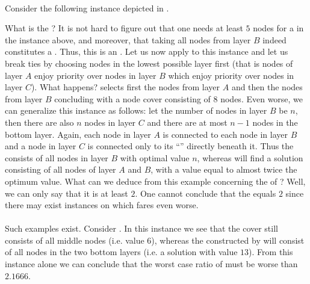 \paragraph{}
Consider the following instance depicted in .


What is the ? It is not hard to figure out that one needs at least $5$ nodes for a  in the instance above, and moreover, that taking all nodes from layer $B$ indeed constitutes a . Thus, this is an . Let us now apply  to this instance and let us break ties by choosing nodes in the lowest possible layer first (that is nodes of layer $A$ enjoy priority over nodes in layer $B$ which enjoy priority over nodes in layer $C$). What happens?  selects first the nodes from layer $A$ and then the nodes from layer $B$ concluding with a node cover consisting of $8$ nodes. Even worse, we can generalize this instance as follows: let the number of nodes in layer $B$ be $n$, then there are also $n$ nodes in layer $C$ and there are at most $n-1$ nodes in the bottom layer. Again, each node in layer $A$ is connected to each node in layer $B$ and a node in layer $C$ is connected only to its ``'' directly beneath it. Thus the  consists of all nodes in layer $B$ with optimal value $n$, whereas  will find a solution consisting of all nodes of layer $A$ and $B$, with a value equal to almost twice the optimum value. What can we deduce from this example concerning the  of ? Well, we can only say that it is at least $2$. One cannot conclude that the  equals $2$ since there may exist instances on which  fares even worse.

\paragraph{}
Such examples exist. Consider . In this instance we see that the  cover still consists of all middle nodes (i.e. value $6$), whereas the  constructed by  will consist of all nodes in the two bottom layers (i.e. a solution with value $13$). From this instance alone we can conclude that the worst case ratio of  must be worse than $2.1666$.

